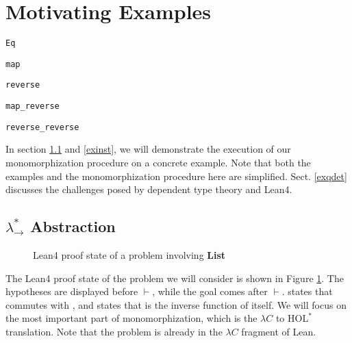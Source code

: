 \section{Motivating Examples} \label{motex}

\begin{lrbox}{\vEq} {\color{hypcolor} \verb|Eq|} \end{lrbox}
\begin{lrbox}{\vmap} {\color{hypcolor} \verb|map|} \end{lrbox}
\begin{lrbox}{\vrev} {\color{hypcolor} \verb|reverse|} \end{lrbox}
\begin{lrbox}{\vmaprev} {\color{hypcolor} \verb|map_reverse|} \end{lrbox}
\begin{lrbox}{\vrevrev} {\color{hypcolor} \verb|reverse_reverse|} \end{lrbox}

In section \ref{exabst} and \ref{exinst}, we will demonstrate the execution of our monomorphization procedure on a
concrete example. Note that both the examples and the monomorphization procedure
here are simplified. Sect. \ref{exqdet} discusses the challenges posed by dependent
type theory and Lean4.

\subsection{$\lambda_\to^*$ Abstraction} \label{exabst}

\begin{figure}
  \begin{CenteredBox}
    
  \end{CenteredBox}
  \caption{Lean4 proof state of a problem involving \textbf{List}} \label{leanlistpretty}
\end{figure}

The Lean4 proof state of the problem we will consider is shown in Figure \ref{leanlistpretty}.
The hypotheses are displayed before $\vdash$, while the goal comes after $\vdash$.
\usebox{\vmaprev} states that \usebox{\vmap} commutes with \usebox{\vrev}, and
\usebox{\vrevrev} states that \usebox{\vrev} is the inverse function of itself.
We will focus on the most important part of monomorphization, which is the
$\lambda C$ to $\text{HOL}^*$ translation. Note that the problem is already in the
$\lambda C$ fragment of Lean.

